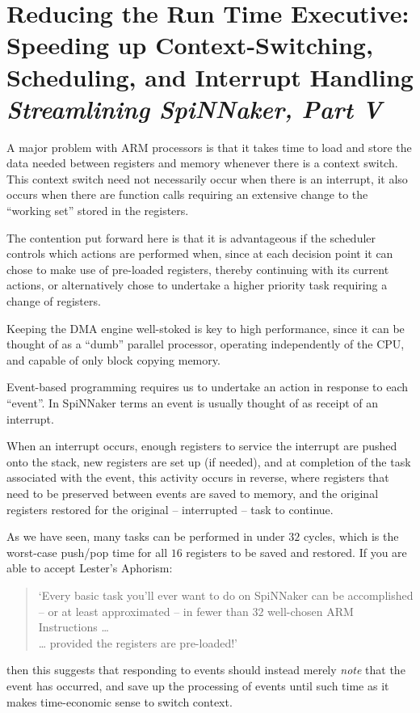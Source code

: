 \chapter[Reduced RTE]{Reducing the Run Time Executive:\\
Speeding up Context-Switching, Scheduling, and Interrupt Handling \\
{\it Streamlining SpiNNaker, Part V}}

A major problem with ARM processors is that it takes time to load and
store the data needed between registers and memory whenever there is a
context switch. This context switch need not necessarily occur when
there is an interrupt, it also occurs when there are function calls
requiring an extensive change to the ``working set'' stored in the
registers.

The contention put forward here is that it is advantageous if the
scheduler controls which actions are performed when, since at each
decision point it can chose to make use of pre-loaded registers,
thereby continuing with its current actions, or alternatively chose to
undertake a higher priority task requiring a change of registers.

Keeping the DMA engine well-stoked is key to high performance, since
it can be thought of as a ``dumb'' parallel processor, operating
independently of the CPU, and capable of only block copying memory.

Event-based programming requires us to undertake an action in response
to each ``event''. In SpiNNaker terms an event is usually thought of
as receipt of an interrupt.

When an interrupt occurs, enough registers to service the interrupt
are pushed onto the stack, new registers are set up (if needed), and
at completion of the task associated with the event, this activity
occurs in reverse, where registers that need to be preserved between
events are saved to memory, and the original registers restored for
the original -- interrupted -- task to continue.

As we have seen, many tasks can be performed in under $32$ cycles, which
is the worst-case push/pop time for all $16$ registers to be saved and
restored. If you are able to accept Lester's Aphorism:
\begin{quote}
  `Every basic task you'll ever want to do on SpiNNaker can be
  accomplished -- or at least approximated -- in fewer than $32$
  well-chosen ARM Instructions \ldots \\ \hspace*{1.5in} \ldots
  provided the registers are pre-loaded!'
\end{quote}
then this suggests that responding to events should instead merely
{\em note} that the event has occurred, and save up the processing of
events until such time as it makes time-economic sense to switch
context.

